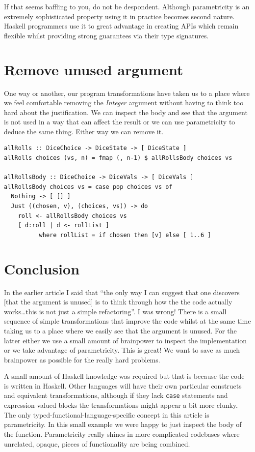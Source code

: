 If that seems baffling to you, do not be despondent. Although parametricity is an extremely sophisticated property using it in practice becomes second nature. Haskell programmers use it to great advantage in creating APIs which remain flexible whilst providing strong guarantees via their type signatures.

\section{Remove unused argument}


One way or another, our program transformations have taken us to a place where we feel comfortable removing the \textit{Integer} argument without having to think too hard about the justification. We can inspect the body and see that the argument is not used in a way that can affect the result or we can use parametricity to deduce the same thing. Either way we can remove it.

\begin{verbatim}
allRolls :: DiceChoice -> DiceState -> [ DiceState ]
allRolls choices (vs, n) = fmap (, n-1) $ allRollsBody choices vs

allRollsBody :: DiceChoice -> DiceVals -> [ DiceVals ]
allRollsBody choices vs = case pop choices vs of
  Nothing -> [ [] ]
  Just ((chosen, v), (choices, vs)) -> do
    roll <- allRollsBody choices vs
    [ d:roll | d <- rollList ]
          where rollList = if chosen then [v] else [ 1..6 ]
\end{verbatim}


\section{Conclusion}


In the earlier article I said that ``the only way I can suggest that one discovers [that the argument is unused] is to think through how the the code actually works\ldots this is not just a simple refactoring''. I was wrong! There is a small sequence of simple transformations that improve the code whilst at the same time taking us to a place where we easily see that the argument is unused. For the latter either we use a small amount of brainpower to inspect the implementation or we take advantage of parametricity. This is great! We want to save as much brainpower as possible for the really hard problems.

A small amount of Haskell knowledge was required but that is because the code is written in Haskell. Other languages will have their own particular constructs and equivalent transformations, although if they lack \texttt{case} statements and expression-valued blocks the transformations might appear a bit more clunky. The only typed-functional-language-specific concept in this article is parametricity. In this small example we were happy to just inspect the body of the function. Parametricity really shines in more complicated codebases where unrelated, opaque, pieces of functionality are being combined.









